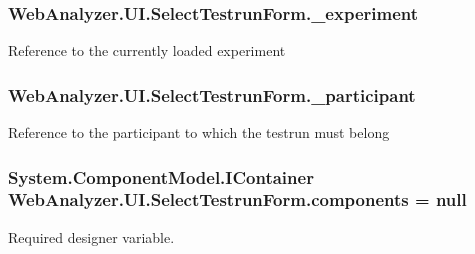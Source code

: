 \subsubsection[{\+\_\+experiment}]{ Web\+Analyzer.\+U\+I.\+Select\+Testrun\+Form.\+\_\+experiment\hspace{0.3cm}{\ttfamily [private]}}\label{class_web_analyzer_1_1_u_i_1_1_select_testrun_form_a26ee759649ddb490af64ca4cc1ed8f7d}


Reference to the currently loaded experiment 

\hypertarget{class_web_analyzer_1_1_u_i_1_1_select_testrun_form_a9fbdf75acb0a8d04157129fbd27bbf84}{}
\subsubsection[{\+\_\+participant}]{ Web\+Analyzer.\+U\+I.\+Select\+Testrun\+Form.\+\_\+participant\hspace{0.3cm}{\ttfamily [private]}}\label{class_web_analyzer_1_1_u_i_1_1_select_testrun_form_a9fbdf75acb0a8d04157129fbd27bbf84}


Reference to the participant to which the testrun must belong 

\hypertarget{class_web_analyzer_1_1_u_i_1_1_select_testrun_form_a43bab9a7a55629d8d75ffd3b719bfe67}{}
\subsubsection[{components}]{\setlength{\rightskip}{0pt plus 5cm}System.\+Component\+Model.\+I\+Container Web\+Analyzer.\+U\+I.\+Select\+Testrun\+Form.\+components = null\hspace{0.3cm}{\ttfamily [private]}}\label{class_web_analyzer_1_1_u_i_1_1_select_testrun_form_a43bab9a7a55629d8d75ffd3b719bfe67}


Required designer variable. 

